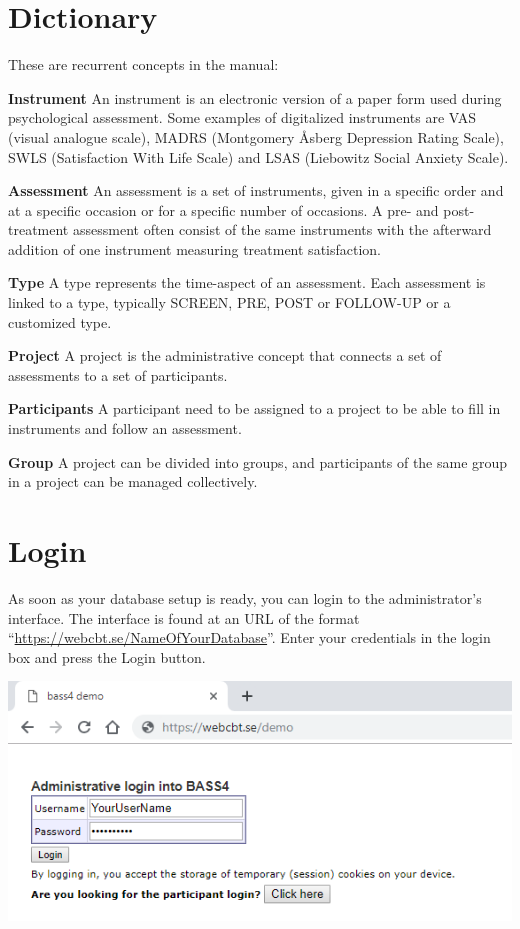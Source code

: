 \documentclass[]{book}
\begin{document}
\hypertarget{dictionary}{%
\chapter{Dictionary}\label{dictionary}}

These are recurrent concepts in the manual:

\textbf{Instrument}
An instrument is an electronic version of a paper form used during psychological assessment. Some examples of digitalized instruments are VAS (visual analogue scale), MADRS (Montgomery Åsberg Depression Rating Scale), SWLS (Satisfaction With Life Scale) and LSAS (Liebowitz Social Anxiety Scale).

\textbf{Assessment}
An assessment is a set of instruments, given in a specific order and at a specific occasion or for a specific number of occasions. A pre- and post-treatment assessment often consist of the same instruments with the afterward addition of one instrument measuring treatment satisfaction.

\textbf{Type}
A type represents the time-aspect of an assessment. Each assessment is linked to a type, typically SCREEN, PRE, POST or FOLLOW-UP or a customized type.

\textbf{Project}
A project is the administrative concept that connects a set of assessments to a set of participants.

\textbf{Participants}
A participant need to be assigned to a project to be able to fill in instruments and follow an assessment.

\textbf{Group}
A project can be divided into groups, and participants of the same group in a project can be managed collectively.

\hypertarget{login}{%
\chapter{Login}\label{login}}

As soon as your database setup is ready, you can login to the administrator's interface. The interface is found at an URL of the format ``\url{https://webcbt.se/NameOfYourDatabase}''. Enter your credentials in the login box and press the Login button.

\includegraphics{images/login.png}
\end{document}
